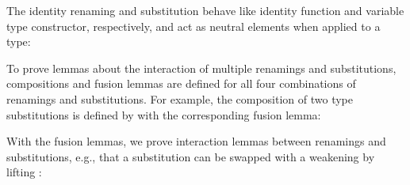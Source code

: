 \documentclass[sigplan,anonymous,review,screen]{acmart}
\newenvironment{AgdaBlock}{%
  \vspace{\AgdaEmptySkip}%
  \AgdaNoSpaceAroundCode{}%
}{%
  \AgdaSpaceAroundCode{}
  \vspace{-\AgdaEmptySkip}
}
\begin{document}
\begin{AgdaBlock}
  \SubDefTren
  \vspace{-2.5mm}
  \SubDefTsub
\end{AgdaBlock}

The identity renaming {\ATidR} and substitution
{\ATidS} behave like identity function and variable
type constructor, respectively, and act as neutral elements when applied to a type:

\begin{AgdaBlock}
  \SubDefTidR
  \TFTidRNeutral
  \vspace{-2.5mm}
  \SubDefTidS
  \TFTidSNeutral
\end{AgdaBlock}


To prove lemmas about the interaction of multiple renamings and substitutions,
compositions and fusion lemmas are defined for all four combinations
of renamings and substitutions.
For example, the composition of two type substitutions is defined by
\SubstExamplesTCompSS
with the corresponding fusion lemma:
\SubstExamplesFusionTSubTSub

With the fusion lemmas, we prove interaction lemmas
between renamings and substitutions, e.g., that a substitution
 can be swapped with a weakening  by lifting :
\TFSwapTsubTwk


\end{document}
